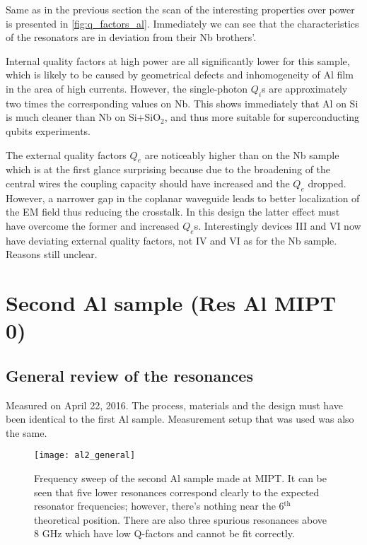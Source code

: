 \documentclass[12pt]{article}
\numberwithin{equation}{section}
\numberwithin{figure}{section}
\begin{document}
Same as in the previous section the scan of the interesting properties over power is presented in \autoref{fig:q_factors_al}. Immediately we can see that the characteristics of the resonators are in deviation from their Nb brothers'. 

Internal quality factors at high power are all significantly lower for this sample, which is likely to be caused by geometrical defects and inhomogeneity of Al film in the area of high currents. However, the single-photon $Q_i$s are approximately two times the corresponding values on Nb. This shows immediately that Al on Si is much cleaner than Nb on Si+SiO$_2$, and thus more suitable for superconducting qubits experiments. 

The external quality factors $Q_e$ are noticeably higher than on the Nb sample which is at the first glance surprising because due to the broadening of the central wires the coupling capacity should have increased and the $Q_e$ dropped. However, a narrower gap in the coplanar waveguide leads to better localization of the EM field thus reducing the crosstalk. In this design the latter effect must have overcome the former and increased $Q_e$s. Interestingly devices III and VI now have deviating external quality factors, not IV and VI as for the Nb sample. Reasons still unclear.
	

\section{Second Al sample (Res Al MIPT 0)}

\subsection{General review of the resonances}

Measured on April 22, 2016. The process, materials and the design must have been identical to the first Al sample. Measurement setup that was used was also the same.

\begin{figure}[h]
\centering
\texttt{[image: al2\_general]}
\caption{Frequency sweep of the second Al sample made at MIPT. It can be seen that five lower resonances correspond clearly to the expected resonator frequencies; however, there's nothing near the 6$^{\text{th}}$ theoretical position. There are also three spurious resonances above 8 GHz which have low Q-factors and cannot be fit correctly.}
\end{figure}
\end{document}
